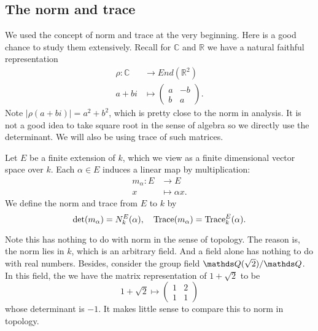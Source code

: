 		\subsection{The norm and trace}
			We used the concept of norm and trace at the very beginning. Here is a good chance to study them extensively. Recall for $\mathds{C}$ and $\mathds{R}$ we have a natural faithful representation
			\[
				\begin{aligned}
					\rho:\mathds{C} &\to End(\mathds{R}^2) \\
							a+bi   &\mapsto \begin{pmatrix} a & -b \\ b & a \end{pmatrix}.
				\end{aligned}
			\]
			Note $|\rho(a+bi)|=a^2+b^2$, which is pretty close to the norm in analysis. It is not a good idea to take square root in the sense of algebra so we directly use the determinant. We will also be using trace of such matrices.
			\begin{definition}
				Let $E$ be a finite extension of $k$, which we view as a finite dimensional vector space over $k$. Each $\alpha \in E$ induces a linear map by multiplication:
				\[
					\begin{aligned}
						m_\alpha : E &\to E \\
								x &\mapsto \alpha{x}.
					\end{aligned}
				\]
				We define the norm and trace from $E$ to $k$ by
				\[
					\det(m_\alpha)=N_k^E(\alpha), \quad \operatorname{Trace}(m_\alpha)=\operatorname{Trace}_k^E(\alpha).
				\]
			\end{definition}
			
			Note this has nothing to do with norm in the sense of topology. The reason is, the norm lies in $k$, which is an arbitrary field. And a field alone has nothing to do with real numbers. Besides, consider the group field $\Q(\sqrt{2})/\Q$. In this field, the we have the matrix representation of $1+\sqrt{2}$ to be
			\[
				1+\sqrt{2} \mapsto \begin{pmatrix} 1 & 2 \\ 1 & 1 \end{pmatrix}
			\]
			whose determinant is $-1$. It makes little sense to compare this to norm in topology.
		

